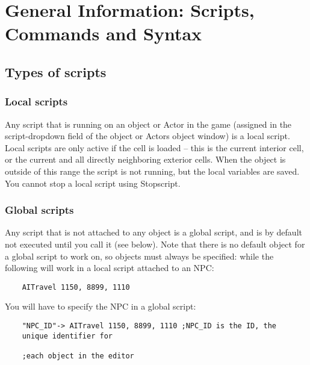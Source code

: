 \hypertarget{general-information-scripts-commands-and-syntax}{%
\section{\texorpdfstring{\hfill\break
General Information: Scripts, Commands and
Syntax}{ General Information: Scripts, Commands and Syntax}}\label{general-information-scripts-commands-and-syntax}}

\hypertarget{types-of-scripts}{%
\subsection{Types of scripts}\label{types-of-scripts}}

\hypertarget{local-scripts}{%
\subsubsection{Local scripts}\label{local-scripts}}

Any script that is running on an object or Actor in the game (assigned
in the script-dropdown field of the object or Actors object window) is a
local script. Local scripts are only active if the cell is loaded --
this is the current interior cell, or the current and all directly
neighboring exterior cells. When the object is outside of this range the
script is not running, but the local variables are saved. You cannot
stop a local script using Stopscript.

\hypertarget{global-scripts}{%
\subsubsection{Global scripts}\label{global-scripts}}

Any script that is not attached to any object is a global script, and is
by default not executed until you call it (see below). Note that there
is no default object for a global script to work on, so objects must
always be specified: while the following will work in a local script
attached to an NPC:

\begin{lstlisting}
	AITravel 1150, 8899, 1110
\end{lstlisting}

You will have to specify the NPC in a global script:

\begin{lstlisting}
	"NPC_ID"-> AITravel 1150, 8899, 1110 ;NPC_ID is the ID, the
	unique identifier for
	
	;each object in the editor
\end{lstlisting}

